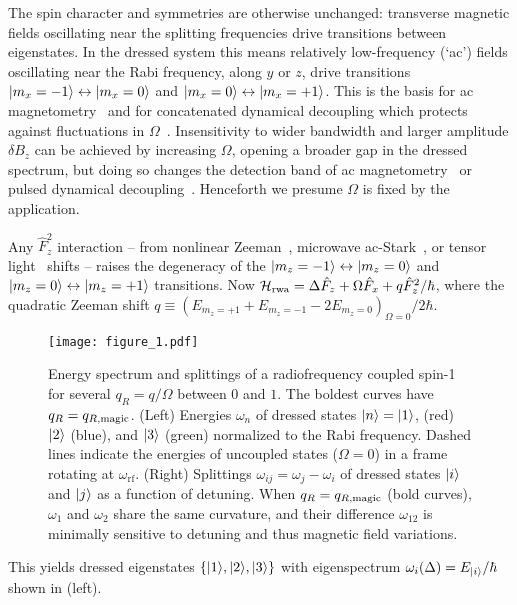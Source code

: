 \documentclass[aps,prl,reprint,superscriptaddress,floatfix]{revtex4-1}
\begin{document}
The spin character and symmetries are otherwise unchanged: transverse magnetic fields oscillating near the splitting frequencies drive transitions between eigenstates.
In the dressed system this means relatively low-frequency (`ac') fields oscillating near the Rabi frequency, along $y$ or $z$, drive transitions $\vert m_x=-1 \rangle  \leftrightarrow \vert m_x=0 \rangle $ and $\vert m_x=0 \rangle  \leftrightarrow \vert m_x=+1 \rangle $.
This is the basis for ac magnetometry~\cite{hirose_continuous_2012} and for concatenated dynamical decoupling  which protects against fluctuations in $\Omega$~\cite{cai_robust_2012}.
Insensitivity to wider bandwidth and larger amplitude $\delta B_z$ can be achieved by increasing $\Omega$, opening a broader gap in the dressed spectrum, but doing so changes the detection band of ac magnetometry~\cite{loretz_radio-frequency_2013} or pulsed dynamical decoupling~\cite{boss_quantum_2017,*schmitt_submillihertz_2017}.
Henceforth we presume $\Omega$ is fixed by the application.

Any $\hat{F}_z^2$ interaction -- from nonlinear Zeeman~\cite{ramsey_molecular_1956}, microwave ac-Stark~\cite{gerbier_resonant_2006}, or tensor light~\cite{smith_continuous_2004} shifts -- raises the degeneracy of the $\vert m_z=-1 \rangle  \leftrightarrow \vert m_z=0 \rangle $ and $\vert m_z=0 \rangle  \leftrightarrow \vert m_z=+1 \rangle $ transitions. 
Now $\mathcal{H}_{\text{rwa}} = \Delta \hat{F}_z + \Omega \hat{F}_x + q \hat{F}_z^2/\hbar$, where the quadratic Zeeman shift $q \equiv (E_{m_z=+1} + E_{m_z=-1} - 2 E_{m_z=0})_{\Omega=0}/2\hbar$.
\begin{figure}
    \texttt{[image: figure\_1.pdf]}
    \caption{
    \label{fig:eigensystem_schematic}
        Energy spectrum and splittings of a radiofrequency coupled spin-1 for several $q_R = q/\Omega$ between $0$ and $1$.
        The boldest curves have $q_R = q_{R,\text{magic}}$.
        (Left) Energies $\omega_n$ of dressed states $\vert n \rangle =\vert 1 \rangle $, (red) $\vert 2 \rangle $ (blue), and $\vert 3 \rangle $ (green) normalized to the Rabi frequency.
        Dashed lines indicate the energies of uncoupled states ($\Omega=0$) in a frame rotating at $\omega_{\text{rf}}$.
        (Right) Splittings $\omega_{ij} = \omega_j - \omega_i$ of dressed states $\vert i \rangle $ and $\vert j \rangle $ as a function of detuning.
        When $q_R=q_{R,\text{magic}}$ (bold curves), $\omega_1$ and $\omega_2$ share the same curvature, and their difference $\omega_{12}$ is minimally sensitive to detuning and thus magnetic field variations.
    }
\end{figure}
This yields dressed eigenstates $\{\vert 1 \rangle , \vert 2 \rangle , \vert 3 \rangle \}$ with eigenspectrum $\omega_i(\Delta) = E_{\vert i \rangle }/\hbar$ shown in  (left).
\end{document}
